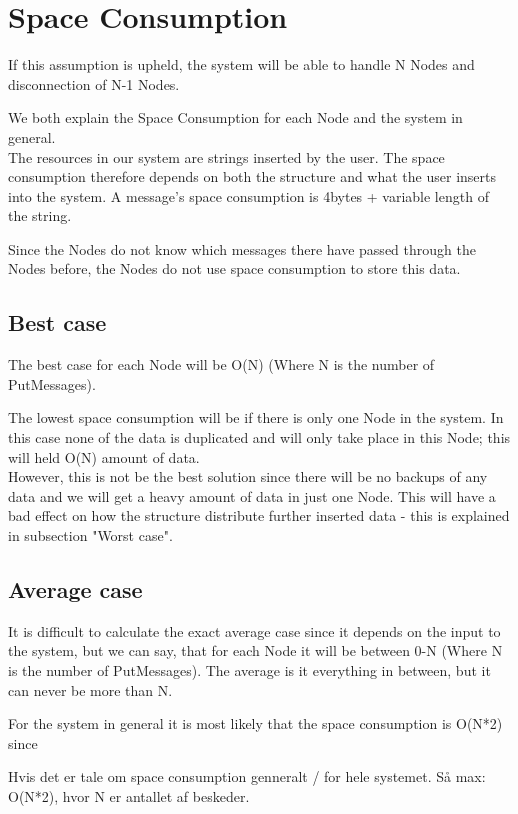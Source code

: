 \section{Space Consumption}
If this assumption is upheld, the system will be able to handle N Nodes and disconnection of N-1 Nodes.

We both explain the Space Consumption for each Node and the system in general.\\
The resources in our system are strings inserted by the user. The space consumption therefore depends on both the structure and what the user inserts into the system. A message's space consumption is 4bytes + variable length of the string. 

Since the Nodes do not know which messages there have passed through the Nodes before, the Nodes do not use space consumption to store this data. 

\subsection{Best case}
The best case for each Node will be O(N) (Where N is the number of PutMessages). 

The lowest space consumption will be if there is only one Node in the system. In this case none of the data is duplicated and will only take place in this Node; this will held O(N) amount of data. \\ However, this is not be the best solution since there will be no backups of any data and we will get a heavy amount of data in just one Node. This will have a bad effect on how the structure distribute further inserted data - this is explained in subsection "Worst case". \\ 

\subsection{Average case}
It is difficult to calculate the exact average case since it depends on the input to the system, but we can say, that for each Node it will be between 0-N (Where N is the number of PutMessages). The average is it everything in between, but it can never be more than N. 

For the system in general it is most likely that the space consumption is O(N*2) since 


Hvis det er tale om space consumption genneralt / for hele systemet. Så max: O(N*2), hvor N er antallet af beskeder.

